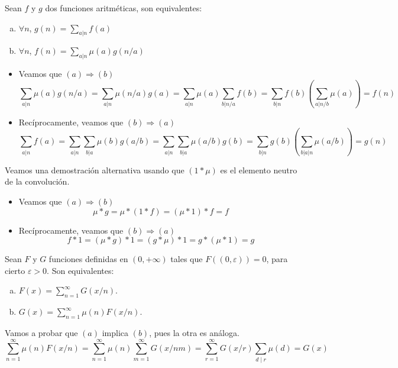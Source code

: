 \documentclass[TAN.tex]{subfiles}
\begin{document}
\begin{prop}
Sean $f$ y $g$ dos funciones aritméticas, son equivalentes:
\begin{enumerate}[(a)]
	\item $\forall n$, $g(n) = \sum_{a|n} f(a)$
	\item $\forall n$, $f(n) = \sum_{a|n}μ(a) g(n/a)$
\end{enumerate}
\end{prop}
\newpage
\begin{dem}\mbox{}
\begin{itemize}
	\item Veamos que $(a) \Rightarrow (b)$
	\[
	\sum_{a|n} μ(a)g(n/a) = \sum_{a|n}μ(n/a)g(a) = \sum_{a|n}μ(a) \sum_{b|n/a} f(b) = \sum_{b|n}f(b)\left(\sum_{a|n/b} μ(a)\right) = f(n)
	\]
	\item Recíprocamente, veamos que  $(b) \Rightarrow (a)$
	\[
	\sum_{a|n}f(a) = \sum_{a|n} \sum_{b|a} μ(b)g(a/b) = \sum_{a|n}\sum_{b|a} μ(a/b)g(b) = \sum_{b|n}g(b)\left(\sum_{b|a|n}μ(a/b)\right) = g(n)
	\]
\end{itemize}
Veamos una demostración alternativa usando que $(1\ast \mu)$ es el elemento neutro de la convolución.
\begin{itemize}
\item Veamos que $(a) \Rightarrow (b)$
	$$
	\mu \ast g = \mu \ast (1 \ast f) = (\mu \ast 1)\ast f= f
	$$
	\item Recíprocamente, veamos que  $(b) \Rightarrow (a)$
	\[
	f \ast 1 = (\mu \ast g) \ast 1 = (g\ast \mu) \ast 1 = g \ast (\mu \ast 1) = g
	\]
\end{itemize}
\end{dem}

\begin{prop}
Sean $F$ y $G$ funciones definidas en $(0,+∞)$ tales que $F((0,\varepsilon))=0$, para cierto $\varepsilon > 0$. Son equivalentes:
\begin{enumerate}[(a)]
\item $F(x) = \sum_{n=1}^{∞} G(x/n)$.
\item $G(x) = \sum_{n=1}^{∞} μ(n) F(x/n)$.
\end{enumerate}
\begin{dem}
Vamos a probar que $(a)$ implica $(b)$, pues la otra es análoga.
$$
\sum_{n=1}^{∞} μ(n) F(x/n) = \sum_{n=1}^{∞} μ(n) \sum_{m=1}^{∞} G(x/nm) = \sum_{r=1}^{∞} G(x/r) \sum_{d\mid r} \mu(d) = G(x)
$$
\end{dem}
\end{prop}
\end{document}
